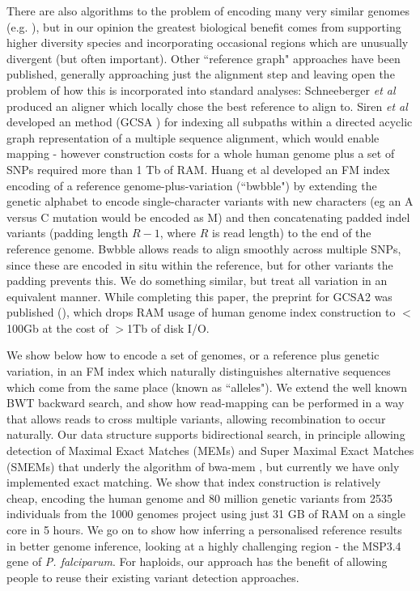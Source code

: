 \documentclass[runningheads,a4paper]{llncs}
\begin{document}
There are also algorithms to the problem of encoding many very similar genomes (e.g. \cite {na}), but in our opinion the greatest biological benefit comes from supporting higher diversity species and incorporating  occasional regions which are  unusually divergent (but often important).
Other ``reference graph" approaches have been published, generally approaching just the alignment step and leaving open the problem of how this is incorporated into standard analyses: Schneeberger \textit{et al} \cite{korbinian} produced an aligner which locally chose the best reference to align to. Siren \textit{et al} developed an  method (GCSA \cite{siren1}) for indexing all subpaths within a directed acyclic graph representation of a multiple sequence alignment, which would enable mapping - however construction costs for a whole human genome plus a set of SNPs required more than 1 Tb of RAM. Huang et al \cite{huang} developed an FM index encoding of a reference genome-plus-variation (``bwbble") by extending the genetic alphabet to encode single-character variants with new characters (eg an A versus C mutation would be encoded as M) and then concatenating padded indel variants (padding length $R-1$, where $R$ is read length) to the end of the reference genome. Bwbble allows reads to align smoothly across multiple SNPs, since these are encoded in situ within the reference, but for other variants the padding prevents this. We do something similar, but treat all variation in an equivalent manner.  While completing this paper, the preprint for GCSA2 was published (\cite{siren2}), which drops RAM usage of human genome index construction to $<$100Gb at the cost of $>$1Tb of disk I/O.   

 We show below how to encode a set of genomes, or a reference plus  genetic variation, in an FM index which naturally distinguishes alternative sequences which come from the same place (known as ``alleles"). We extend the well known BWT backward search, and show how read-mapping can be performed in a way that allows reads to cross multiple variants, allowing recombination to occur naturally. Our data structure  supports bidirectional search, in principle allowing detection of Maximal Exact Matches (MEMs) and Super Maximal Exact Matches (SMEMs) that underly the algorithm of bwa-mem \cite{bwa}, but currently we have only implemented exact matching. We show that index construction is relatively cheap, encoding the human genome and 80 million genetic variants from 2535 individuals from the 1000 genomes project using just 31 GB of RAM on a single core in 5 hours. We go on to show how inferring a personalised reference results in better genome inference, looking at a highly challenging region - the MSP3.4 gene of \textit{P. falciparum}. For haploids, our approach has the benefit of allowing people to reuse their existing variant detection approaches. 
\end{document}
